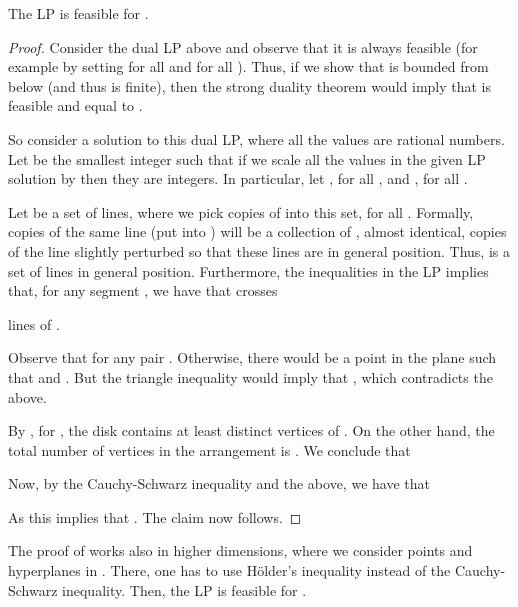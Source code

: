 \documentclass[12pt]{article}
\newcommand{\Term}[1]{\textsf{#1}}
\newcommand{\LP}{\Term{L{}P}\xspace}
\providecommand{\Holder}{H\"older\xspace}
\begin{document}
\begin{lemma}
    The \LP  is feasible for .

\end{lemma}
\begin{proof}
    Consider the dual \LP above and observe that it is always feasible
    (for example by setting  for all  and  for all ).
    Thus, if we show that  is bounded from below (and
    thus is finite), then the strong duality theorem would imply that
     is feasible and equal to .

    So consider a solution to this dual \LP, where all the values are
    rational numbers. Let  be the smallest integer such that if
    we scale all the values in the given \LP solution by  then they are
    integers. In particular, let , for all
    , and , for all
    .

    Let  be a set of lines, where we pick  copies
    of  into this set, for all . Formally,  copies of the same line
     (put into ) will be a collection of ,
    almost identical, copies of the line  slightly perturbed
    so that these  lines are in general position.  Thus,
     is a set of  lines in general position. Furthermore, the inequalities
    in the \LP implies that, for any segment , we have that  crosses
    
    lines of . 

    Observe that  for any pair . Otherwise, there would be a point
     in the plane such that 
    and . But the triangle
    inequality would imply that , which contradicts the above.
      
    By , for , the disk
     contains at least
     distinct vertices of . On
    the other hand, the total number of vertices in the arrangement
     is . We conclude that
    
    Now, by the Cauchy-Schwarz inequality and the above, we have that
    
    As  this implies that . The claim now follows.
\end{proof}



\begin{remark}
    The proof of  works also in higher dimensions,
    where we consider points and hyperplanes in . There, one
    has to use \Holder's inequality instead of the Cauchy-Schwarz
    inequality. Then, the \LP is feasible for .
\end{remark}
\end{document}
